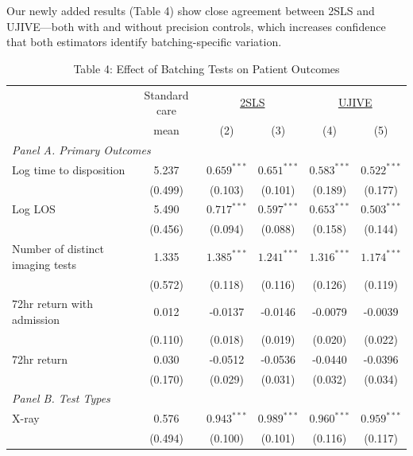 \documentclass[11pt]{article}
\newcommand{\1}{\hbox{\rm 1\kern-.35em 1}}
\begin{document}
Our newly added results (Table 4) show close agreement between 2SLS and UJIVE---both with and without precision controls, which increases confidence that both estimators identify batching-specific variation.

\begin{table}[t!]
\centering
\caption*{Table 4: Effect of Batching Tests on Patient Outcomes}
\begin{threeparttable}
\begin{tabular}{lccccc}
\toprule
& Standard care & \multicolumn{2}{c}{\underline{2SLS}} & \multicolumn{2}{c}{\underline{UJIVE}} \\
& mean & (2) & (3) & (4) & (5) \\
\midrule

\multicolumn{6}{l}{\textit{Panel A. Primary Outcomes}} \\[0.5em]

Log time to disposition 
& 5.237 
& $0.659^{***}$ & $0.651^{***}$
& $0.583^{***}$ & $0.522^{***}$ \\
& (0.499)
& (0.103) & (0.101)
& (0.189) & (0.177) \\[0.5em]

Log LOS
& 5.490
& $0.717^{***}$ & $0.597^{***}$
& $0.653^{***}$ & $0.503^{***}$ \\
& (0.456)
& (0.094) & (0.088)
& (0.158) & (0.144) \\[0.5em]

Number of distinct imaging tests 
& 1.335
& $1.385^{***}$ & $1.241^{***}$
& $1.316^{***}$ & $1.174^{***}$ \\
& (0.572)
& (0.118) & (0.116)
& (0.126) & (0.119) \\[0.5em]

72hr return with admission 
& 0.012
& -0.0137 & -0.0146
& -0.0079 & -0.0039 \\
& (0.110)
& (0.018) & (0.019)
& (0.020) & (0.022) \\[0.5em]

72hr return 
& 0.030
& -0.0512 & -0.0536
& -0.0440 & -0.0396 \\
& (0.170)
& (0.029) & (0.031)
& (0.032) & (0.034) \\[0.5em]


\multicolumn{6}{l}{\textit{Panel B. Test Types}} \\[0.5em]

X-ray 
& 0.576
& $0.943^{***}$ & $0.989^{***}$
& $0.960^{***}$ & $0.959^{***}$ \\
& (0.494)
& (0.100) & (0.101)
& (0.116) & (0.117) \\[0.5em]


\end{tabular}
\end{threeparttable}
\end{table}
\end{document}
